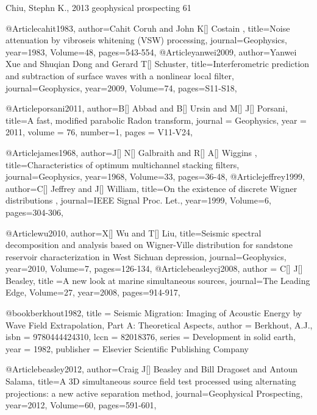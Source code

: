 {Chiu, Stephn K., 2013 geophysical prospecting 61


@Article{cahit1983,
  author={Cahit Coruh and John K[] Costain },
  title={Noise attenuation by vibroseis whitening (VSW) processing},
  journal={Geophysics},
  year=1983,
  Volume=48,
  pages={543-554},
}
@Article{yanwei2009,
  author={Yanwei Xue and Shuqian Dong and Gerard T[] Schuster},
  title={Interferometric prediction and subtraction of surface waves with a nonlinear local filter},
  journal={Geophysics},
  year=2009,
  Volume=74,
  pages={S11-S18},
}





@Article{porsani2011,
  author={B[] Abbad and B[] Ursin and M[] J[] Porsani},
  title={A fast, modified parabolic Radon transform},
  journal = 	 {Geophysics},
  year = 	 2011,
  volume =	 76,
  number=1,
  pages =	 {V11-V24},
}



@Article{james1968,
  author={J[] N[] Galbraith and R[] A[] Wiggins },
  title={Characteristics of optimum multichannel stacking filters},
  journal={Geophysics},
  year=1968,
  Volume=33,
  pages={36-48},
}
@Article{jeffrey1999,
  author={C[] Jeffrey and J[] William},
  title={On the existence of discrete Wigner distributions
},
  journal={IEEE Signal Proc. Let.},
  year=1999,
  Volume=6,
  pages={304-306},
}

@Article{wu2010,
  author={X[] Wu and T[] Liu},
  title={Seismic spectral decomposition and analysis based on Wigner-Ville distribution for sandstone reservoir characterization in West Sichuan depression},
  journal={Geophysics},
  year=2010,
  Volume=7,
  pages={126-134},
}
@Article{beasleycj2008,
  author = {C[] J[] Beasley},
  title ={A new look at marine simultaneous sources},
  journal={The Leading Edge},
  Volume=27,
  year=2008,
  pages={914-917},
}

@book{berkhout1982,
title     = {Seismic Migration: Imaging of Acoustic Energy by Wave Field Extrapolation, Part A: Theoretical Aspects},
author    = {Berkhout, A.J.},
isbn      = {9780444424310},
lccn      = {82018376},
series    = {Development in solid earth},
year      = {1982},
publisher = {Elsevier Scientific Publishing Company}
}

@Article{beasley2012,
  author={Craig J[] Beasley and Bill Dragoset and Antoun Salama},
  title={A 3{D} simultaneous source field test processed using alternating projections: a new active separation method},
  journal={Geophysical Prospecting},
  year=2012,
  Volume=60,
  pages={591-601},
}

}
